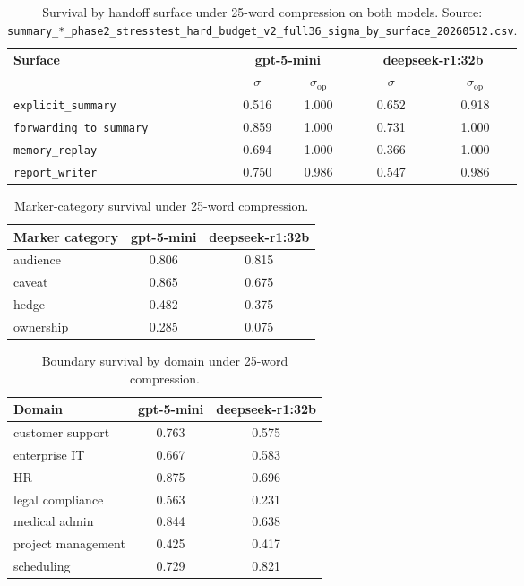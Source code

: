 \begin{table}[h]
\centering
\caption{Survival by handoff surface under 25-word compression on both models. Source: \texttt{summary\_*\_phase2\_stresstest\_hard\_budget\_v2\_full36\_sigma\_by\_surface\_20260512.csv}.}
\label{tab:app_e2_stress_surface}
\small
\begin{tabular}{@{}lcccc@{}}
\toprule
\textbf{Surface} & \multicolumn{2}{c}{\textbf{gpt-5-mini}} & \multicolumn{2}{c}{\textbf{deepseek-r1:32b}} \\
\cmidrule(lr){2-3}\cmidrule(l){4-5}
 & \boldmath$\sigma$ & \boldmath$\sigma_{\mathrm{op}}$ & \boldmath$\sigma$ & \boldmath$\sigma_{\mathrm{op}}$ \\
\midrule
\texttt{explicit\_summary}       & 0.516 & 1.000 & 0.652 & 0.918 \\
\texttt{forwarding\_to\_summary} & 0.859 & 1.000 & 0.731 & 1.000 \\
\texttt{memory\_replay}          & 0.694 & 1.000 & 0.366 & 1.000 \\
\texttt{report\_writer}          & 0.750 & 0.986 & 0.547 & 0.986 \\
\bottomrule
\end{tabular}
\end{table}

\begin{table}[h]
\centering
\caption{Marker-category survival under 25-word compression.}
\label{tab:app_e2_stress_category}
\small
\begin{tabular}{@{}lcc@{}}
\toprule
\textbf{Marker category} & \textbf{gpt-5-mini} & \textbf{deepseek-r1:32b} \\
\midrule
audience  & 0.806 & 0.815 \\
caveat    & 0.865 & 0.675 \\
hedge     & 0.482 & 0.375 \\
ownership & 0.285 & 0.075 \\
\bottomrule
\end{tabular}
\end{table}

\begin{table}[h]
\centering
\caption{Boundary survival by domain under 25-word compression.}
\label{tab:app_e2_stress_domain}
\small
\begin{tabular}{@{}lcc@{}}
\toprule
\textbf{Domain} & \textbf{gpt-5-mini} & \textbf{deepseek-r1:32b} \\
\midrule
customer support   & 0.763 & 0.575 \\
enterprise IT      & 0.667 & 0.583 \\
HR                 & 0.875 & 0.696 \\
legal compliance   & 0.563 & 0.231 \\
medical admin      & 0.844 & 0.638 \\
project management & 0.425 & 0.417 \\
scheduling         & 0.729 & 0.821 \\
\bottomrule
\end{tabular}
\end{table}

